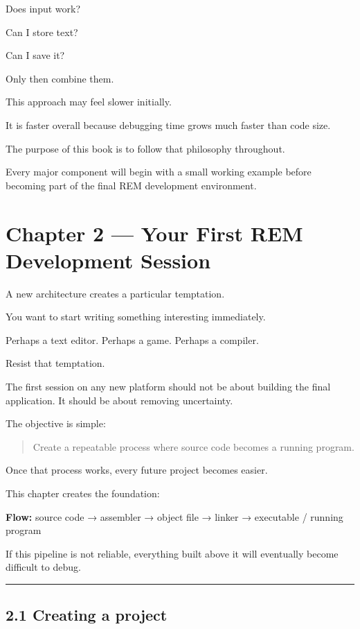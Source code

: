 \documentclass[
  oneside,
  openany]{book}
\begin{document}
Does input work?

Can I store text?

Can I save it?

Only then combine them.

This approach may feel slower initially.

It is faster overall because debugging time grows much faster than code
size.

The purpose of this book is to follow that philosophy throughout.

Every major component will begin with a small working example before
becoming part of the final REM development environment.

\hypertarget{chapter-2-your-first-rem-development-session}{%
\chapter{Chapter 2 --- Your First REM Development
Session}\label{chapter-2-your-first-rem-development-session}}

A new architecture creates a particular temptation.

You want to start writing something interesting immediately.

Perhaps a text editor. Perhaps a game. Perhaps a compiler.

Resist that temptation.

The first session on any new platform should not be about building the
final application. It should be about removing uncertainty.

The objective is simple:

\begin{quote}
Create a repeatable process where source code becomes a running program.
\end{quote}

Once that process works, every future project becomes easier.

This chapter creates the foundation:

\textbf{Flow:} source code → assembler → object file → linker →
executable / running program

If this pipeline is not reliable, everything built above it will
eventually become difficult to debug.

\begin{center}\rule{0.5\linewidth}{0.5pt}\end{center}

\hypertarget{creating-a-project}{%
\section{2.1 Creating a project}\label{creating-a-project}}
\end{document}
